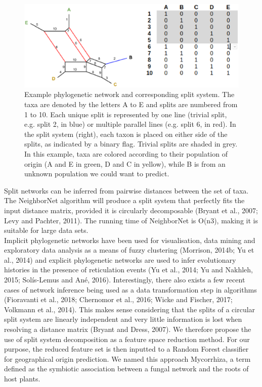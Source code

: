 \documentclass{bioinfo}
\begin{document}
\begin{figure}[]%
    \includegraphics[width=\linewidth]{figure1.eps}
    \caption{Example phylogenetic network and corresponding split system. The taxa are denoted by the letters A to E and splits are numbered from 1 to 10. Each unique split is represented by one line (trivial split, e.g. split 2, in blue) or multiple parallel lines (e.g. split 6, in red). In the split system (right), each taxon is placed on either side of the splits, as indicated by a binary flag. Trivial splits are shaded in grey. In this example, taxa are colored according to their population of origin (A and E in green, D and C in yellow), while B is from an unknown population we could want to predict.}\label{fig:01}
\end{figure}
Split networks can be inferred from pairwise distances between the set of taxa. The NeighborNet algorithm will produce a split system that perfectly fits the input distance matrix, provided it is circularly decomposable (Bryant et al., 2007; Levy and Pachter, 2011). The running time of NeighborNet is O(n3), making it is suitable for large data sets.\\
Implicit phylogenetic networks have been used  for visualisation, data mining and exploratory data analysis as a means of fuzzy clustering (Morrison, 2014b; Yu et al., 2014) and explicit phylogenetic networks are used to infer evolutionary histories in the presence of reticulation events (Yu et al., 2014; Yu and Nakhleh, 2015; Solís-Lemus and Ané, 2016). Interestingly, there also exists a few recent cases of network inference being used as a data transformation step in algorithms (Fioravanti et al., 2018; Chernomor et al., 2016; Wicke and Fischer, 2017; Volkmann et al., 2014). This makes sense considering that the splits of a circular split system are linearly independent and very little information is lost when resolving a distance matrix (Bryant and Dress, 2007). We therefore propose the use of split system decomposition as a feature space reduction method. For our purpose, the reduced feature set is then inputted to a Random Forest classifier for geographical origin prediction. We named this approach Mycorrhiza, a term defined as the symbiotic association between a fungal network and the roots of host plants.
\end{document}
